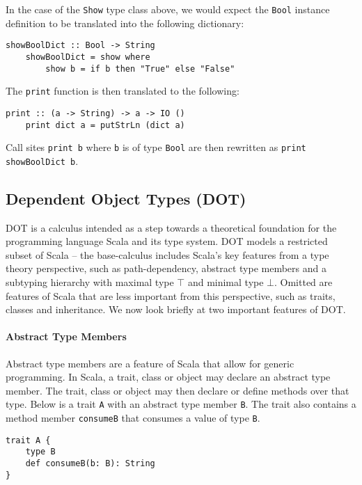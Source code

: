 In the case of the \texttt{Show} type class above, we would expect the
\texttt{Bool} instance definition to be translated into the following
dictionary:
\begin{lstlisting}[mathescape]
    showBoolDict :: Bool -> String
    showBoolDict = show where
        show b = if b then "True" else "False"
\end{lstlisting}

\noindent The \texttt{print} function is then translated to the following:
\begin{lstlisting}[mathescape]
    print :: (a -> String) -> a -> IO ()
    print dict a = putStrLn (dict a)
\end{lstlisting}

\noindent Call sites \texttt{print b} where \texttt{b} is of type \texttt{Bool}
are then rewritten as \texttt{print showBoolDict b}.

\subsection{Dependent Object Types (DOT)}
DOT \cite{AMO12, ARO14, AR16, AGORS16, AR17} is a calculus intended as a step
towards a theoretical foundation for the programming language Scala and its type
system. DOT models a restricted subset of Scala -- the base-calculus includes
Scala's key features from a type theory perspective, such as path-dependency,
abstract type members and a subtyping hierarchy with maximal type $\top$ and
minimal type $\bot$. Omitted are features of Scala that are less important from
this perspective, such as traits, classes and inheritance. We now look briefly
at two important features of DOT.

\paragraph{Abstract Type Members}
Abstract type members are a feature of Scala that allow for generic programming.
In Scala, a trait, class or object may declare an abstract type member. The
trait, class or object may then declare or define methods over that type. Below
is a trait \texttt{A} with an abstract type member \texttt{B}. The trait also
contains a method member \texttt{consumeB} that consumes a value of type
\texttt{B}.

\begin{minipage}{\linewidth}
\begin{lstlisting}[mathescape]
trait A {
    type B
    def consumeB(b: B): String
}
\end{lstlisting}
\end{minipage}

